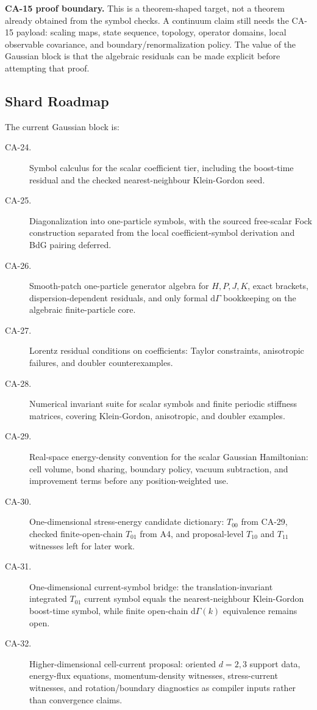 \textbf{CA-15 proof boundary.}  This is a theorem-shaped target, not a theorem
already obtained from the symbol checks.  A continuum claim still needs the
CA-15 payload: scaling maps, state sequence, topology, operator domains, local
observable covariance, and boundary/renormalization policy.  The value of the
Gaussian block is that the algebraic residuals can be made explicit before
attempting that proof.

\subsection{Shard Roadmap}

The current Gaussian block is:
\begin{description}
\item[CA-24.]
Symbol calculus for the scalar coefficient tier, including the boost-time
residual and the checked nearest-neighbour Klein-Gordon seed.
\item[CA-25.]
Diagonalization into one-particle symbols, with the sourced free-scalar Fock
construction separated from the local coefficient-symbol derivation and BdG
pairing deferred.
\item[CA-26.]
Smooth-patch one-particle generator algebra for \(H,P,J,K\), exact brackets,
dispersion-dependent residuals, and only formal \(\mathrm{d}\Gamma\)
bookkeeping on the algebraic finite-particle core.
\item[CA-27.]
Lorentz residual conditions on coefficients: Taylor constraints, anisotropic
failures, and doubler counterexamples.
\item[CA-28.]
Numerical invariant suite for scalar symbols and finite periodic stiffness
matrices, covering Klein-Gordon, anisotropic, and doubler examples.
\item[CA-29.]
Real-space energy-density convention for the scalar Gaussian Hamiltonian:
cell volume, bond sharing, boundary policy, vacuum subtraction, and improvement
terms before any position-weighted use.
\item[CA-30.]
One-dimensional stress-energy candidate dictionary: \(T_{00}\) from CA-29,
checked finite-open-chain \(T_{01}\) from A4, and proposal-level \(T_{10}\) and
\(T_{11}\) witnesses left for later work.
\item[CA-31.]
One-dimensional current-symbol bridge: the translation-invariant integrated
\(T_{01}\) current symbol equals the nearest-neighbour Klein-Gordon boost-time
symbol, while finite open-chain \(\mathrm{d}\Gamma(k)\) equivalence remains open.
\item[CA-32.]
Higher-dimensional cell-current proposal: oriented \(d=2,3\) support data,
energy-flux equations, momentum-density witnesses, stress-current witnesses, and
rotation/boundary diagnostics as compiler inputs rather than convergence claims.
\end{description}

